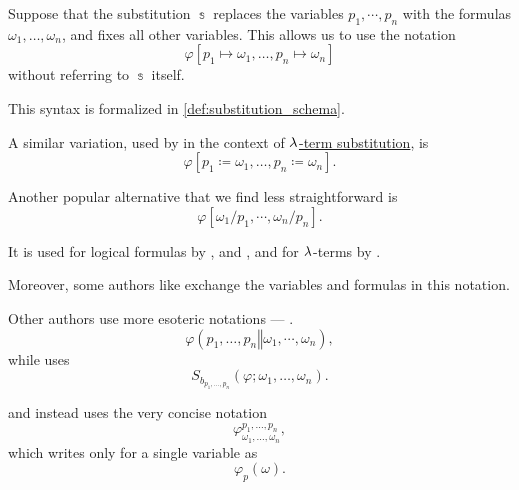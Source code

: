 \begin{remark}\label{rem:substitution_notation}
  Suppose that the substitution \( \Bbbs \) replaces the variables \( p_1, \cdots, p_n \) with the formulas \( \omega_1, \ldots, \omega_n \), and fixes all other variables. This allows us to use the notation
  \begin{equation*}
    \varphi[p_1 \mapsto \omega_1, \ldots, p_n \mapsto \omega_n]
  \end{equation*}
  without referring to \( \Bbbs \) itself.

  This syntax is formalized in \cref{def:substitution_schema}.

  A similar variation, used by  in the context of \hyperref[def:lambda_term_substitution]{\( {\mathrm \lambda} \)-term substitution}, is
  \begin{equation*}
    \varphi[p_1 \coloneqq \omega_1, \ldots, p_n \coloneqq \omega_n].
  \end{equation*}

  Another popular alternative that we find less straightforward is
  \begin{equation*}
    \varphi[\omega_1 / p_1, \cdots, \omega_n / p_n].
  \end{equation*}

  It is used for logical formulas by ,  and , and for \( {\mathrm \lambda} \)-terms by .

  Moreover, some authors like  exchange the variables and formulas in this notation.

  Other authors use more esoteric notations --- .
  \begin{equation*}
    \varphi(p_1, \ldots, p_n \mathrel{\Vert} \omega_1, \cdots, \omega_n),
  \end{equation*}
  while  uses
  \begin{equation*}
    S_{b_{p_1, \ldots, p_n}}(\varphi; \omega_1, \ldots, \omega_n).
  \end{equation*}

   and  instead uses the very concise notation
  \begin{equation*}
    \varphi^{p_1, \ldots, p_n}_{\omega_1, \ldots, \omega_n},
  \end{equation*}
  which  writes only for a single variable as
  \begin{equation*}
    \varphi_p(\omega).
  \end{equation*}
\end{remark}

